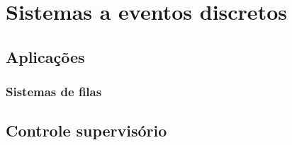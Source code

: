 \chapter{Sistemas a eventos discretos}
\label{cap:seds}

\section{Aplicações}

\subsection{Sistemas de filas}

\section{Controle supervisório}
